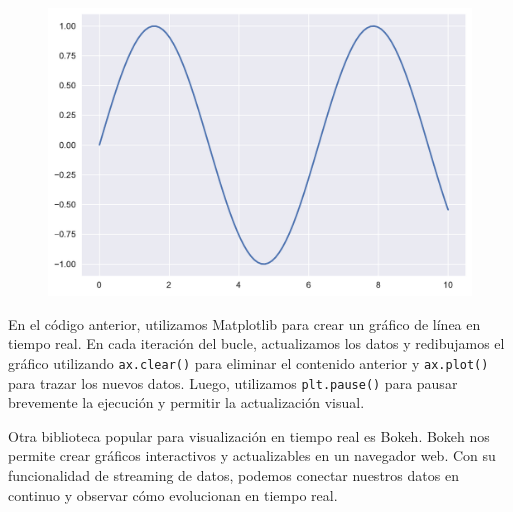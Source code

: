 \documentclass[
  a4paper,
]{article}
\begin{document}
\begin{figure}[H]

{\centering \includegraphics{index_files/figure-pdf/cell-20-output-1.pdf}

}

\end{figure}

En el código anterior, utilizamos Matplotlib para crear un gráfico de
línea en tiempo real. En cada iteración del bucle, actualizamos los
datos y redibujamos el gráfico utilizando \texttt{ax.clear()} para
eliminar el contenido anterior y \texttt{ax.plot()} para trazar los
nuevos datos. Luego, utilizamos \texttt{plt.pause()} para pausar
brevemente la ejecución y permitir la actualización visual.

Otra biblioteca popular para visualización en tiempo real es Bokeh.
Bokeh nos permite crear gráficos interactivos y actualizables en un
navegador web. Con su funcionalidad de streaming de datos, podemos
conectar nuestros datos en continuo y observar cómo evolucionan en
tiempo real.
\end{document}

